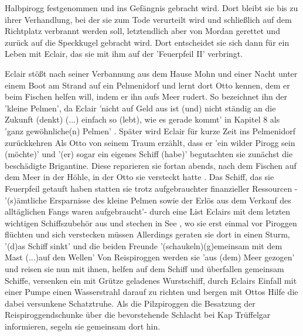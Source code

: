 {Halbpirogg festgenommen\cite[S.549ff]{pir}  und ins Gefängnis gebracht wird.\cite[S.549]{pir} Dort bleibt sie bis zu ihrer Verhandlung, bei der sie zum Tode verurteilt wird\cite[S.569]{pir} und schließlich auf dem Richtplatz verbrannt werden soll, letztendlich aber von Mordan gerettet und zurück auf die Speckkugel gebracht wird.\cite[S.607]{pir} Dort entscheidet sie sich dann für ein Leben mit Eclair\cite[S.635]{pir}, das sie mit ihm auf der 'Feuerpfeil II' verbringt.\cite[S.639ff]{pir}

Eclair stößt nach seiner Verbannung aus dem Hause Mohn \cite[S.41]{pir} und einer Nacht unter einem Boot am Strand \cite[S.43]{pir} auf ein Pelmenidorf \cite[S.43]{pir} und lernt dort Otto kennen, dem er beim Fischen helfen will, indem er ihn aufs Meer rudert.\cite[S.45]{pir} So bezeichnet ihn der 'kleine Pelmen'\cite[S.45]{pir}, da Eclair 'nicht auf Geld aus ist (und) nicht ständig an die Zukunft (denkt) (...) einfach so (lebt), wie es gerade kommt' in Kapitel 8 als 'ganz gewöhnliche(n) Pelmen' \cite[S.68]{pir}. Später wird Eclair für kurze Zeit ins Pelmenidorf zurückkehren \cite[S.515ff]{pir}Als Otto von seinem Traum erzählt, dass er 'ein wilder Pirogg sein (möchte)'\cite[S.69f]{pir} und '(er) sogar ein eigenes Schiff (habe)' \cite[S.70]{pir} begutachten sie zunächst die beschädigte Brigantine\cite[S.75f]{pir}. Diese reparieren sie fortan abends, nach dem Fischen auf dem Meer\cite[S.90]{pir} in der Höhle, in der Otto sie versteckt hatte \cite[S.74f]{pir}. Das Schiff, das sie Feuerpfeil getauft haben\cite[S.92f]{pir} statten sie trotz aufgebrauchter finanzieller Ressourcen - '(s)ämtliche Ersparnisse des kleine Pelmen sowie der Erlös aus dem Verkauf des alltäglichen Fangs waren aufgebraucht'\cite[S.105]{pir}- durch eine List Eclairs mit dem letzten wichtigen Schiffszubehör aus\cite[S.106ff]{pir} und stechen in See \cite[S.136]{pir}, wo sie erst einmal vor Piroggen flüchten und sich verstecken müssen \cite[S.153ff]{pir} Allerdings geraten sie dort in einen Sturm, '(d)as Schiff sinkt' \cite[S.204]{pir} und die beiden Freunde '(schaukeln)(g)emeinsam mit dem Mast (...)auf den Wellen'\cite[S.205]{pir} Von Reispiroggen werden sie 'aus (dem) Meer gezogen'\cite[S.213]{pir} und reisen sie nun mit ihnen, helfen auf dem Schiff\cite[S.217]{pir} und überfallen gemeinsam Schiffe\cite[S.279ff]{pir}, versenken ein mit Grütze geladenes Wurstschiff,\cite[S.315]{pir} durch Eclairs Einfall mit einer Pumpe einen Wasserstrahl darauf zu richten \cite[S.310ff]{pir} und bergen mit Ottos Hilfe die dabei versunkene Schatztruhe.\cite[S.315f]{pir} Als die Pilzpiroggen die Besatzung der Reispiroggendschunke über die bevorstehende Schlacht bei Kap Trüffelgar informieren, segeln sie gemeinsam dort hin.\cite[S.318ff]{pir}
}

